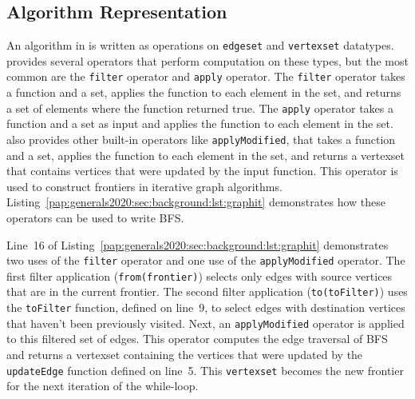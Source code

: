 \subsection{Algorithm Representation}
An algorithm in \graphit is written as operations on \lstinline[language=graphit]{edgeset} and \lstinline[language=graphit]{vertexset} datatypes. 
\graphit provides several operators that perform computation on these types, but the most common are the \lstinline[language=graphit]{filter} operator and \lstinline[language=graphit]{apply} operator.
The \lstinline[language=graphit]{filter} operator takes a function and a set, applies the function to each element in the set, and returns a set of elements where the function returned true.
The \lstinline[language=graphit]{apply} operator takes a function and a set as input and applies the function to each element in the set. %
\graphit also provides other built-in operators like \lstinline[language=graphit]{applyModified}, that takes a function and a set, applies the function to each element in the set, and returns a vertexset that contains vertices that were updated by the input function. 
This operator is used to construct frontiers in iterative graph algorithms. 
Listing~\ref{pap:generals2020:sec:background:lst:graphit} demonstrates how these operators can be used to write BFS.

Line~16 of Listing~\ref{pap:generals2020:sec:background:lst:graphit} demonstrates two uses of the \lstinline[language=graphit]{filter} operator and one use of the \lstinline[language=graphit]{applyModified} operator. 
The first filter application (\lstinline[language=graphit]{from(frontier)}) selects only edges with source vertices that are in the current frontier. 
The second filter application (\lstinline[language=graphit]{to(toFilter)}) uses the \lstinline[language=graphit]{toFilter} function, defined on line~9, to select edges with destination vertices that haven't been previously visited.
Next, an \lstinline[language=graphit]{applyModified} operator is applied to this filtered set of edges.
This operator computes the edge traversal of BFS and returns a vertexset containing the vertices that were updated by the \lstinline[language=graphit]{updateEdge} function defined on line~5.
This \lstinline[language=graphit]{vertexset} becomes the new frontier for the next iteration of the while-loop.


